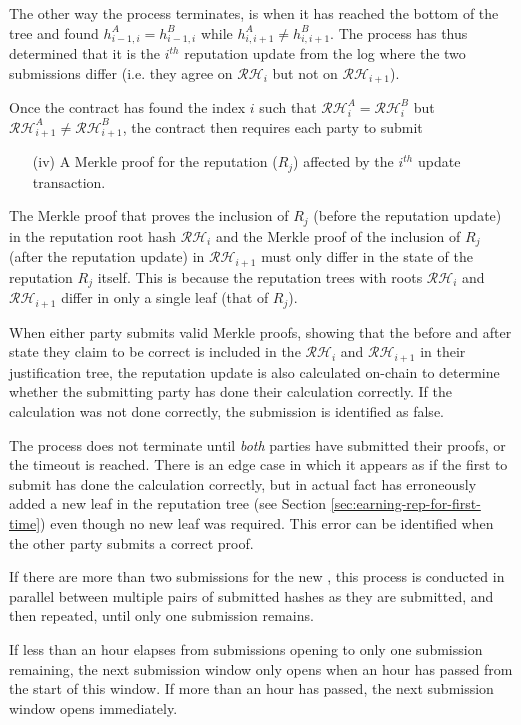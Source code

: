 The other way the process terminates, is when it has reached the bottom of the tree and found $h_{i-1,i}^A = h_{i-1,i}^B$ while $h_{i,i+1}^A \neq h_{i,i+1}^B$. The process has thus determined that it is the $i^{th}$ reputation update from the log where the two submissions differ (i.e. they agree on $\mathcal{RH}_{i}$ but not on $\mathcal{RH}_{i+1}$).

Once the contract has found the index $i$ such that $\mathcal{RH}^A_{i}=\mathcal{RH}^B_{i}$ but $\mathcal{RH}^A_{i+1}\neq\mathcal{RH}^B_{i+1}$, the contract then requires each party to submit
\begin{itemize}
 \item[(iv)] A Merkle proof for the reputation ($R_j$) affected by the $i^{th}$ update transaction.
\end{itemize}
The Merkle proof that proves the inclusion of $R_j$ (before the reputation update) in the reputation root hash $\mathcal{RH}_{i}$ and the Merkle proof of the inclusion of $R_j$ (after the reputation update) in $\mathcal{RH}_{i+1}$ must only differ in the state of the reputation $R_j$ itself. This is because the reputation trees with roots $\mathcal{RH}_{i}$ and $\mathcal{RH}_{i+1}$ differ in only a single leaf (that of $R_j$). 

When either party submits valid Merkle proofs, showing that the before and after state they claim to be correct is included in the $\mathcal{RH}_{i}$ and $\mathcal{RH}_{i+1}$ in their justification tree, the reputation update is also calculated on-chain to determine whether the submitting party has done their calculation correctly. If the calculation was not done correctly, the submission is identified as false.

The process does not terminate until \emph{both} parties have submitted their proofs, or the timeout is reached. There is an edge case in which it appears as if the first to submit has done the calculation correctly, but in actual fact has erroneously added a new leaf in the reputation tree (see Section \ref{sec:earning-rep-for-first-time}) even though no new leaf was required. This error can be identified when the other party submits a correct proof.

If there are more than two submissions for the new , this process is conducted in parallel between multiple pairs of submitted hashes as they are submitted, and then repeated, until only one submission remains.

If less than an hour elapses from submissions opening to only one submission remaining, the next submission window only opens when an hour has passed from the start of this window. If more than an hour has passed, the next submission window opens immediately.

